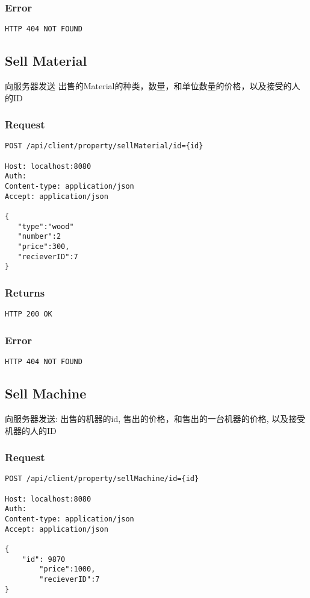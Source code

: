 \documentclass{article}
\begin{document}
\subsubsection*{Error}
\begin{lstlisting}
HTTP 404 NOT FOUND
\end{lstlisting}





\subsection{Sell Material}
向服务器发送 出售的Material的种类，数量，和单位数量的价格，以及接受的人的ID
\subsubsection*{Request}
\begin{lstlisting}
POST /api/client/property/sellMaterial/id={id}

Host: localhost:8080
Auth:
Content-type: application/json
Accept: application/json

{
   "type":"wood"
   "number":2
   "price":300,
   "recieverID":7
}
\end{lstlisting}
\subsubsection*{Returns}
\begin{lstlisting}
HTTP 200 OK
\end{lstlisting}

\subsubsection*{Error}
\begin{lstlisting}
HTTP 404 NOT FOUND
\end{lstlisting}









\subsection{Sell Machine}
向服务器发送: 出售的机器的id, 售出的价格，和售出的一台机器的价格, 以及接受机器的人的ID
\subsubsection*{Request}
\begin{lstlisting}
POST /api/client/property/sellMachine/id={id}

Host: localhost:8080
Auth:
Content-type: application/json
Accept: application/json

{
	"id": 9870
        "price":1000,
        "recieverID":7
}
\end{lstlisting}
\end{document}
